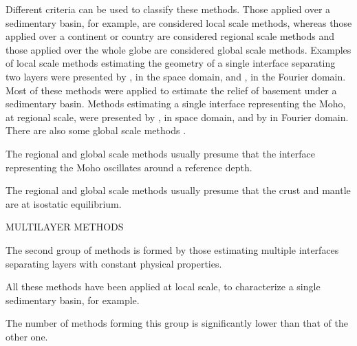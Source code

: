 \documentclass[manuscript]{geophysics}
\begin{document}
Different criteria can be used to classify these methods.
Those applied over a sedimentary basin, for example, are considered local scale methods,
whereas those applied over a continent or country are considered regional scale methods
and those applied over the whole globe are considered global scale methods.
Examples of local scale methods estimating the geometry of a single
interface separating two layers were presented by
\citet{bott1960, tanner1967, cordell-henderson1968, dyrelius-vogel1972, pedersen1977,
pilkington-crossley1986, richardson-macinnes1989, barbosa-etal1997, 
barbosa-etal1999, barbosa-etal1999b, silva-etal2006, pilkington2006, 
chakravarthi-sundararajan2007, martins-etal2010, silva-etal2010, lima-etal2011, 
martins-etal2011, barnes-barraud2012, silva-etal2014, silva-santos2017},
in the space domain, and 
\citet{oldenburg1974, granser1987, reamer-ferguson1989, guspi1993},
in the Fourier domain.
Most of these methods were applied to estimate the relief of basement under
a sedimentary basin.
Methods estimating a single interface representing the Moho, at regional
scale, were presented by 
\citet{shin-etal2009, bagherbandi-eshagh2012, barzaghi-biagi2014, sampietro2015, uieda-barbosa2017},
in space domain, and by 
\citet{braitenberg-etal1997, braitenberg-zadro1999, vandermeijde-etal2013}
in Fourier domain.
There are also some global scale methods 
\citep[e.g.,][]{sunkel1985, sjoberg2009}.

The regional and global scale methods usually presume that the interface representing
the Moho oscillates around a reference depth.

The regional and global scale methods usually presume that the crust and mantle are
at isostatic equilibrium.

MULTILAYER METHODS

The second group of methods is formed by those estimating multiple interfaces
separating layers with constant physical properties.

\citep{pilkington-crossley1986b, gallardo-etal2005, camacho-etal2011, salem-etal2014}

All these methods have been applied at local scale, to characterize a single 
sedimentary basin, for example.

The number of methods forming this group is significantly lower than that
of the other one.
\end{document}
